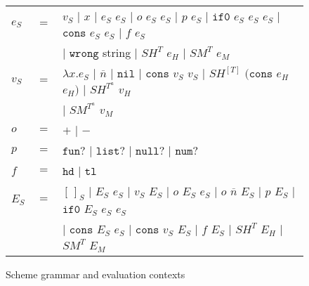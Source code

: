 \begin{figure}[p]
\centering
\begin{tabular}{lcl}
\vspace{5pt}

$e_{S}$ & $=$ & $v_{S}$ $\vert$ $x$ $\vert$ $e_{S}$ $e_{S}$ $\vert$ $o$ $e_{S}$ $e_{S}$ $\vert$ $p$ $e_{S}$ $\vert$ $\mathtt{if0}$ $e_{S}$ $e_{S}$ $e_{S}$ $\vert$ $\mathtt{cons}$ $e_{S}$ $e_{S}$ $\vert$ $f$ $e_{S}$ \\

\vspace{5pt}

&& $\vert$ $\mathtt{wrong}$ string $\vert$ $SH^{T}$ $e_{H}$ $\vert$ $SM^{T}$ $e_{M}$ \\

\vspace{5pt}

$v_{S}$ & $=$ & $\lambda x.e_{S}$ $\vert$ $\overline{n}$ $\vert$ $\mathtt{nil}$ $\vert$ $\mathtt{cons}$ $v_{S}$ $v_{S}$ $\vert$ $SH^{[T]}$ $(\mathtt{cons}$ $e_{H}$ $e_{H})$ $\vert$ $SH^{T^{a}}$ $v_{H}$ \\

\vspace{5pt}

&& $\vert$ $SM^{T^{a}}$ $v_{M}$ \\

\vspace{5pt}

$o$ & $=$ & $+$ $\vert$ $-$ \\

\vspace{5pt}

$p$ & $=$ & $\mathtt{fun?}$ $\vert$ $\mathtt{list?}$ $\vert$ $\mathtt{null?}$ $\vert$ $\mathtt{num?}$ \\

\vspace{5pt}

$f$ & $=$ & $\mathtt{hd}$ $\vert$ $\mathtt{tl}$ \\

\vspace{5pt}

$E_{S}$ & $=$ & $[\,]_{S}$ $\vert$ $E_{S}$ $e_{S}$ $\vert$ $v_{S}$ $E_{S}$ $\vert$ $o$ $E_{S}$ $e_{S}$ $\vert$ $o$ $\overline{n}$ $E_{S}$ $\vert$ $p$ $E_{S}$ $\vert$ $\mathtt{if0}$ $E_{S}$ $e_{S}$ $e_{S}$ \\

\vspace{5pt}

&& $\vert$ $\mathtt{cons}$ $E_{S}$ $e_{S}$ $\vert$ $\mathtt{cons}$ $v_{S}$ $E_{S}$ $\vert$ $f$ $E_{S}$ $\vert$ $SH^{T}$ $E_{H}$ $\vert$ $SM^{T}$ $E_{M}$
\end{tabular}
\caption{Scheme grammar and evaluation contexts}
\label{csg}
\end{figure}